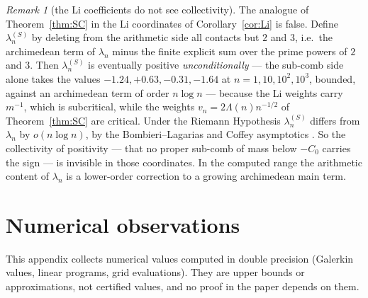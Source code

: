 \documentclass[11pt]{amsart}
\theoremstyle{definition}
\theoremstyle{remark}
\newtheorem{remark}[theorem]{Remark}
\begin{document}
\begin{remark}[the Li coefficients do not see collectivity]\label{rem:LiSC}
The analogue of Theorem~\ref{thm:SC} in the Li coordinates of Corollary~\ref{cor:Li} is false. Define
$\lambda_n^{(S)}$ by deleting from the arithmetic side all contacts but $2$ and $3$, i.e.\ the
archimedean term of $\lambda_n$ minus the finite explicit sum over the prime powers of $2$ and $3$.
Then $\lambda_n^{(S)}$ is eventually positive \emph{unconditionally} --- the sub-comb side alone takes
the values $-1.24,+0.63,-0.31,-1.64$ at $n=1,10,10^2,10^3$, bounded, against an archimedean term of
order $n\log n$ --- because the Li weights carry $m^{-1}$, which is subcritical, while the weights
$v_n=2\Lambda(n)n^{-1/2}$ of Theorem~\ref{thm:SC} are critical. Under the Riemann Hypothesis
$\lambda_n^{(S)}$ differs from $\lambda_n$ by $o(n\log n)$, by the Bombieri--Lagarias and Coffey
asymptotics \cite{BombieriLagarias1999,Coffey2005}. So the collectivity of positivity --- that no
proper sub-comb of mass below $-C_0$ carries the sign --- is invisible in those coordinates. In the
computed range the arithmetic content of $\lambda_n$ is a lower-order correction to a growing
archimedean main term.
\end{remark}

\section{Numerical observations}\label{app:diag}

This appendix collects numerical values computed in double precision (Galerkin values, linear
programs, grid evaluations). They are upper bounds or approximations, not certified values, and no
proof in the paper depends on them.
\end{document}
